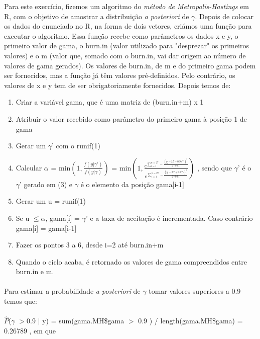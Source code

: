 \documentclass{article}
\begin{document}
				Para este exercício, fizemos um algoritmo do \textit{método de Metropolis-Hastings} em R, com o objetivo de amostrar a distribuição \textit{a posteriori} de $\gamma$. Depois de colocar os dados do enunciado no R, na forma de dois vetores, criámos uma função para executar o algoritmo. Essa função recebe como parâmetros os dados x e y, o primeiro valor de gama, o burn.in (valor utilizado para "desprezar" os primeiros valores) e o m (valor que, somado com o burn.in, vai dar origem ao número de valores de gama gerados). Os valores de burn.in, de m e do primeiro gama podem ser fornecidos, mas a função já têm valores pré-definidos. Pelo contrário, os valores de x e y tem de ser obrigatoriamente fornecidos. Depois temos de:
				\begin{enumerate}
					\item Criar a variável gama, que é uma matriz de (burn.in+m) x 1
  					 \item Atribuir o valor recebido como parâmetro do primeiro gama à posição 1 de gama
					 \item Gerar um $\gamma$' com o runif(1)
					 \item Calcular $\alpha$ = min$\left(1,\frac{f(y | \gamma')}{f(y| \gamma )}\right)$ = min$\left(1, \frac{e^{\sum_{i=1}^{n=27}-\frac{(y_{i}-2.7+0.9\gamma'^{x_{i}})^2}{2*0.01}}}{e^{\sum_{i=1}^{n=27}-\frac{(y_{i}-2.7+0.9\gamma^{x_{i}})^2}{2*0.01}}}\right)$ , sendo que $\gamma$' é o $\gamma$' gerado em (3) e $\gamma$ é o elemento da posição gama[i-1]
					\item Gerar um u = runif(1)
					\item Se u $\leq \alpha$, gama[i] = $\gamma$' e a taxa de aceitação é incrementada. Caso contrário gama[i] = gama[i-1]
					\item Fazer os pontos 3 a 6, desde i=2 até burn.in+m 
					\item Quando o ciclo acaba, é retornado os valores de gama compreendidos entre burn.in e m. 
 				\end{enumerate}
				\paragraph{}
				Para estimar a probabilidade \textit{a posteriori} de \textit{$\gamma$} tomar valores superiores a 0.9 temos que:
				
				\paragraph{}
				$\hat{P}$($\gamma$ $>$0.9 $|$ y) = sum(gama.MH\$gama $>$ 0.9 ) / length(gama.MH\$gama) = 0.26789 , em que
\end{document}

